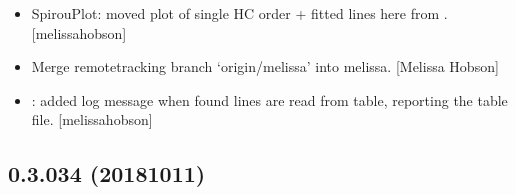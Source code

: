 \documentclass[a4paper,10pt,english]{report}
\begin{document}
\begin{itemize}
\item {} 
SpirouPlot: moved plot of single HC order + fitted lines here from
. {[}melissa\sphinxhyphen{}hobson{]}

\item {} 
Merge remote\sphinxhyphen{}tracking branch ‘origin/melissa’ into melissa. {[}Melissa
Hobson{]}

\item {} 
: added log message when found lines are read from
table, reporting the table file. {[}melissa\sphinxhyphen{}hobson{]}

\end{itemize}


\subsection{0.3.034 (2018\sphinxhyphen{}10\sphinxhyphen{}11)}
\end{document}
